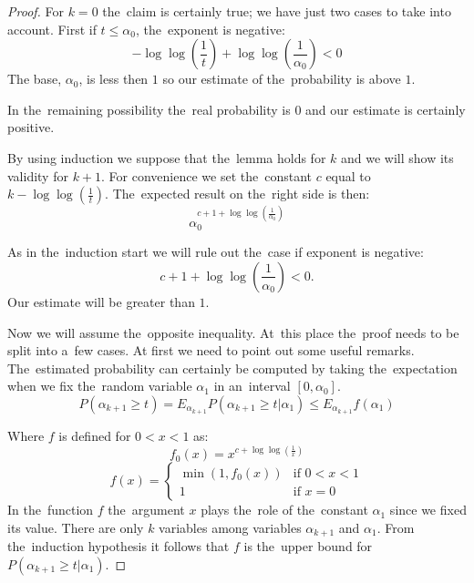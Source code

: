\begin{proof}
For $k = 0$ the~claim is certainly true; we have just two cases to take into account. First if $t \leq \alpha_0$, the~exponent is negative:
\begin{displaymath}
-\log \log (\frac{1}{t}) + \log \log \left(\frac{1}{\alpha_0}\right) < 0
\end{displaymath}
The base, $\alpha_0$, is less then $1$ so our estimate of the~probability is above $1$. 

In the~remaining possibility the~real probability is $0$ and our estimate is certainly positive.

By using induction we suppose that the~lemma holds for $k$ and we will show its validity for $k + 1$. For convenience we set the~constant $c$ equal to $k - \log \log \left(\frac{1}{t}\right)$. The~expected result on the~right side is then:
\begin{displaymath}
\alpha_0^{c + 1 + \log \log \left(\frac{1}{\alpha_0}\right)}
\end{displaymath}

As in the~induction start we will rule out the~case if exponent is negative:
\begin{displaymath}
c + 1 + \log \log \left(\frac{1}{\alpha_0}\right) < 0\textit{.}
\end{displaymath}
Our estimate will be greater than $1$. 

Now we will assume the~opposite inequality. At~this place the~proof needs to be split into a~few cases. At first we need to point out some useful remarks. The~estimated probability can certainly be computed by taking the~expectation when we fix the~random variable $\alpha_1$ in an~interval $[0, \alpha_0]$.
\begin{displaymath}
P(\alpha_{k+1} \geq t) = E_{\alpha_{k+1}} P(\alpha_{k+1} \geq t | \alpha_1) \leq E_{\alpha_{k+1}} f(\alpha_1)
\end{displaymath}

Where $f$ is defined for $0 < x < 1$ as:
\begin{displaymath}
f_0(x) = x ^ {c + \log \log \left(\frac{1}{x}\right)}
\end{displaymath}
\begin{equation}\label{f-definition}
 f(x) = 
  \begin{cases} 
   \min(1, f_0(x)) & \text{if } 0 < x < 1 \\
   1 & \text{if } x = 0
  \end{cases}
\end{equation}
In the~function $f$ the~argument $x$ plays the~role of the~constant $\alpha_1$ since we fixed its value. There are only $k$ variables among variables $\alpha_{k+1}$ and $\alpha_1$. From the~induction hypothesis it follows that $f$ is the~upper bound for $P(\alpha_{k+1} \geq t | \alpha_1)$.


\end{proof}
